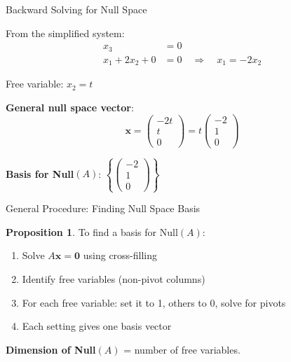 \documentclass[10pt]{beamer}
\theoremstyle{definition}
\newtheorem{prop}{Proposition}[section]
\newcommand{\x}[1]{\alert{\textbf{#1}}}
\begin{document}
\begin{frame}{Backward Solving for Null Space}

From the simplified system:
\begin{align*}
x_3 &= 0 \\
x_1 + 2x_2 + 0 &= 0 \quad \Rightarrow \quad x_1 = -2x_2
\end{align*}

\vspace{1em}

Free variable: $x_2 = t$

\vspace{1em}

\x{General null space vector}:
$$\mathbf{x} = \begin{pmatrix} -2t \\ t \\ 0 \end{pmatrix} = t \begin{pmatrix} -2 \\ 1 \\ 0 \end{pmatrix}$$

\vspace{1em}

\x{Basis for Null}$(A)$: $\left\{ \begin{pmatrix} -2\\1\\0 \end{pmatrix} \right\}$

\end{frame}

\begin{frame}{General Procedure: Finding Null Space Basis}

\begin{prop}
To find a basis for $\text{Null}(A)$:
\begin{enumerate}
\item Solve $A\mathbf{x} = \mathbf{0}$ using cross-filling
\item Identify free variables (non-pivot columns)
\item For each free variable: set it to 1, others to 0, solve for pivots
\item Each setting gives one basis vector
\end{enumerate}
\end{prop}

\vspace{1em}

\x{Dimension of Null}$(A)$ = number of free variables.

\end{frame}
\end{document}
